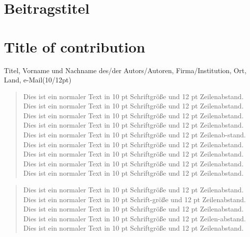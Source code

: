 \documentclass[10pt,a4paper,oneside,abstracton]{scrartcl}
\begin{document}
\section*{Beitragstitel}
\section*{Title of contribution}
Titel, Vorname und Nachname des/der Autors/Autoren, Firma/Institution, Ort, Land, e-Mail(10/12pt) 


\begin{abstract} %
\noindent %
Dies ist ein normaler Text in 10 pt Schriftgröße und 12 pt Zeilenabstand. Dies ist ein normaler Text in 10 pt Schriftgröße und 12 pt Zeilenabstand. Dies ist ein normaler Text in 10 pt Schriftgröße und 12 pt Zeilenabstand. Dies ist ein normaler Text in 10 pt Schriftgröße und 12 pt Zeilenabstand. Dies ist ein normaler Text in 10 pt Schriftgröße und 12 pt Zeilenab-stand. Dies ist ein normaler Text in 10 pt Schriftgröße und 12 pt Zeilenabstand. Dies ist ein normaler Text in 10 pt Schriftgröße und 12 pt Zeilenabstand. Dies ist ein normaler Text in 10 pt Schriftgröße und 12 pt Zeilenabstand. Dies ist ein normaler Text in 10 pt Schriftgröße und 12 pt Zeilenabstand.
\end{abstract}

\renewcommand{\abstractname}{Abstract} %

\begin{abstract}
\noindent %
Dies ist ein normaler Text in 10 pt Schriftgröße und 12 pt Zeilenabstand. Dies ist ein normaler Text in 10 pt Schrift-größe und 12 pt Zeilenabstand. Dies ist ein normaler Text in 10 pt Schriftgröße und 12 pt Zeilenabstand. Dies ist ein normaler Text in 10 pt Schriftgröße und 12 pt Zeilen-abstand. Dies ist ein normaler Text in 10 pt Schriftgröße und 12 pt Zeilenabstand.
\end{abstract}
\end{document}
